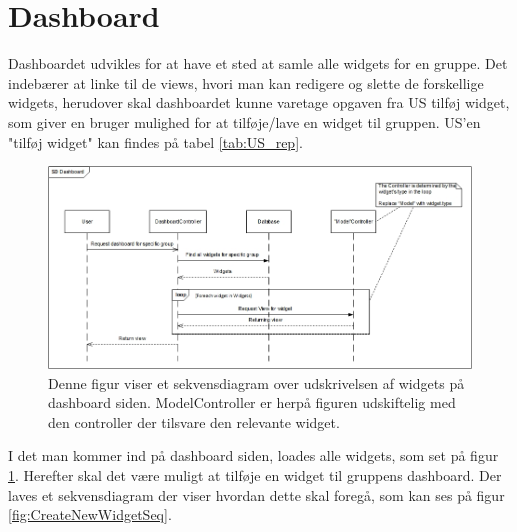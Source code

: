 \section{Dashboard}
Dashboardet udvikles for at have et sted at samle alle widgets for en gruppe. Det indebærer at linke til de views, hvori man kan redigere og slette de forskellige widgets, herudover skal dashboardet kunne varetage opgaven fra US  tilføj widget, som giver en bruger mulighed for at tilføje/lave en widget til gruppen. US'en "tilføj widget" kan findes på tabel \ref{tab:US_rep}. \\

\begin{figure}[H]
    \centering
    \includegraphics[width=1\textwidth]{09_Arkitektur/Dashboard/Sekvens.jpg}
    \caption{Denne figur viser et sekvensdiagram over udskrivelsen af widgets på dashboard siden. ModelController er herpå figuren udskiftelig med den controller der tilsvare den relevante widget. }
    \label{fig:dashboard_onLoad_seq}
\end{figure}

I det man kommer ind på dashboard siden, loades alle widgets, som set på figur \ref{fig:dashboard_onLoad_seq}. Herefter skal det være muligt at tilføje en widget til gruppens dashboard. Der laves et sekvensdiagram der viser hvordan dette skal foregå, som kan ses på figur \ref{fig:CreateNewWidgetSeq}.


